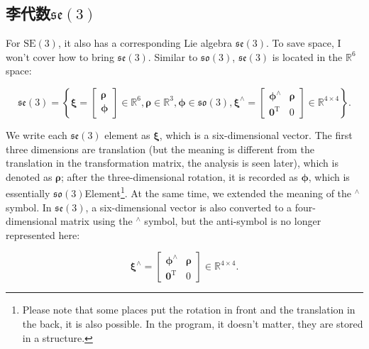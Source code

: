\subsection{李代数$\mathfrak{se}(3)$}

For $\mathrm{SE}(3)$, it also has a corresponding Lie algebra $\mathfrak{se}(3)$.
To save space, I won't cover how to bring $\mathfrak{se}(3)$.
Similar to $\mathfrak{so}(3)$, $\mathfrak{se}(3)$ is located in the $\mathbb{R}^6$ space:

\begin{equation}
\mathfrak{se}(3) = \left\{ { \boldsymbol{\xi} = \left[ \begin{array}{l}
\boldsymbol{\rho} \\
\boldsymbol{\phi}
\end{array} \right]
\in { \mathbb{R}^6} ,
\boldsymbol{\rho} \in { \mathbb{R}^3}, \boldsymbol{\phi} \in \mathfrak{so} \left( 3 \right),{ \boldsymbol{\xi} ^ \wedge } = \left[ {\begin{array}{*{20}{c}}
{{ \boldsymbol{\phi} ^ \wedge }}& \boldsymbol{\rho} \\
{{\bm{0}^\mathrm{T}}}&0
\end{array}} \right] \in { \mathbb{R}^{4 \times 4}}} \right\}.
\end{equation}

We write each $\mathfrak{se}(3)$ element as $\boldsymbol{\xi}$, which is a six-dimensional vector.
The first three dimensions are translation (but the meaning is different from the translation in the transformation matrix, the analysis is seen later), which is denoted as $\boldsymbol{\rho}$; after the three-dimensional rotation, it is recorded as $\boldsymbol{\phi}$, which is essentially $\mathfrak{so}(3)$Element\footnote{Please note that some places put the rotation in front and the translation in the back, it is also possible.
In the program, it doesn't matter, they are stored in a structure. }.
At the same time, we extended the meaning of the $^\wedge$ symbol.
In $\mathfrak{se}(3)$, a six-dimensional vector is also converted to a four-dimensional matrix using the $^\wedge$ symbol, but the anti-symbol is no longer represented here:

\begin{equation}
{ \boldsymbol{\xi} ^ \wedge } = \left[ {\begin{array}{*{20}{c}}
{{ \boldsymbol{\phi} ^ \wedge }}& \boldsymbol{\rho} \\
{{\bm{0}^\mathrm{T}}}&0
\end{array}} \right] \in { \mathbb{R}^{4 \times 4}}.
\end{equation}

